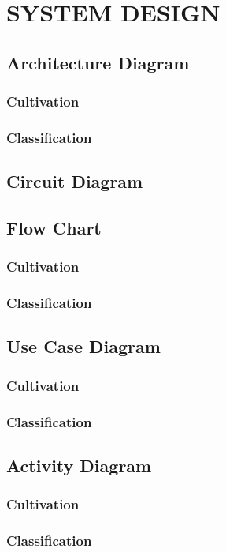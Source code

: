 \chapter{SYSTEM DESIGN}

\section{Architecture Diagram}

\subsection{Cultivation}

\subsection{Classification}

\section{Circuit Diagram}

\section{Flow Chart}

\subsection{Cultivation}

\subsection{Classification}

\section{Use Case Diagram}

\subsection{Cultivation}

\subsection{Classification}

\section{Activity Diagram}

\subsection{Cultivation}

\subsection{Classification}
